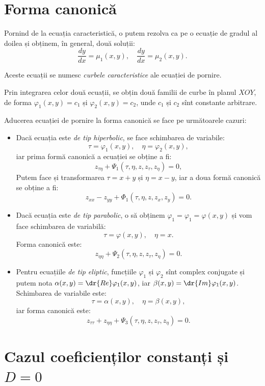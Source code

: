 
\section{Forma canonică}

Pornind de la ecuația caracteristică, o putem rezolva ca pe o ecuație de gradul
al doilea și obținem, în general, două soluții:
\[
  \dfrac{dy}{dx} = \mu_1(x, y), \quad \dfrac{dy}{dx} = \mu_2(x, y).
\]

Aceste ecuații se numesc \emph{curbele caracteristice} ale ecuației de pornire.

Prin integrarea celor două ecuații, se obțin două familii de curbe în planul
$ XOY $, de forma $ \varphi_1(x, y) = c_1 $ și $ \varphi_2(x, y) = c_2 $, unde
$ c_1 $ și $ c_2 $ sînt constante arbitrare.

Aducerea ecuației de pornire la forma canonică se face pe următoarele cazuri:
\begin{itemize}
\item Dacă ecuația este \emph{de tip hiperbolic}, se face schimbarea de variabile:
  \[
    \tau = \varphi_1(x, y), \quad \eta = \varphi_2(x, y),
  \]
  iar prima formă canonică a ecuației se obține a fi:
  \[
    z_{\tau\eta} + \Psi_1(\tau, \eta, z, z_\tau, z_\eta) = 0,
  \]
  Putem face și transformarea $ \tau = x + y $ și $ \eta = x - y $, iar a doua
  formă canonică se obține a fi:
  \[
    z_{xx} - z_{yy} + \Phi_1(\tau, \eta, z, z_x, z_y) = 0.
  \]
\item Dacă ecuația este \emph{de tip parabolic}, o să obținem
  $ \varphi_1 = \varphi_1 = \varphi(x, y) $ și vom face schimbarea de variabilă:
  \[
    \tau = \varphi(x, y), \quad \eta = x.
  \]
  Forma canonică este:
  \[
    z_{\eta\eta} + \Psi_2(\tau, \eta, z, z_\tau, z_\eta) = 0.
  \]
\item Pentru ecuațiile \emph{de tip eliptic}, funcțiile $ \varphi_1 $ și $ \varphi_2 $
  sînt complex conjugate și putem nota $ \alpha(x, y) = \dr{Re} \varphi_1(x, y) $,
  iar $ \beta(x, y) = \dr{Im}\varphi_1(x, y) $. Schimbarea de variabile este:
  \[
    \tau = \alpha(x, y), \quad \eta = \beta(x, y),
  \]
  iar forma canonică este:
  \[
    z_{\tau\tau} + z_{\eta\eta} + \Psi_3(\tau, \eta, z, z_\tau, z_\eta) = 0.
  \]
\end{itemize}

\section{Cazul coeficienților constanți și $D = 0$}
\label{sec:coef-ct-d0}

